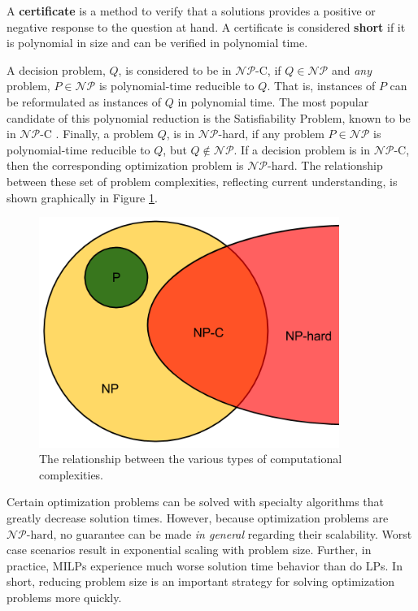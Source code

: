 \begin{define}
A \textbf{certificate} is a method to verify that a solutions provides a
positive or negative response to the question at hand. A certificate is
considered \textbf{short} if it is polynomial in size and can be verified in
polynomial time.
\end{define}

\noindent
A decision problem, $Q$, is considered to be in $\mathcal{NP}$-C, if $Q \in
\mathcal{NP}$ and \textit{any} problem, $P \in \mathcal{NP}$ is polynomial-time
reducible to $Q$. That is, instances of $P$ can be reformulated as instances of
$Q$ in polynomial time. The most popular candidate of this polynomial reduction
is the Satisfiability Problem, known to be in $\mathcal{NP}$-C
\cite{Cook:1971:CTP,levin1973universal}. Finally, a problem $Q$, is in
$\mathcal{NP}$-hard, if any problem $P \in \mathcal{NP}$ is polynomial-time
reducible to $Q$, but $Q \not\in \mathcal{NP}$. If a decision problem is in
$\mathcal{NP}$-C, then the corresponding optimization problem is
$\mathcal{NP}$-hard. The relationship between these set of problem complexities,
reflecting current understanding, is shown graphically in Figure
\ref{fig:complexity}.

\begin{figure}[H]
  \begin{center}
    \includegraphics[height=7.5cm]{./chapters/1-intro/figs/complexity.png}
  \caption{The relationship between the various types of computational complexities.}
  \label{fig:complexity}
  \end{center}
\end{figure}

Certain optimization problems can be solved with specialty algorithms that
greatly decrease solution times. However, because optimization problems are
$\mathcal{NP}\text{-hard}$, no guarantee can be made \textit{in general}
regarding their scalability. Worst case scenarios result in exponential scaling
with problem size. Further, in practice, MILPs experience much worse solution
time behavior than do LPs. In short, reducing problem size is an important
strategy for solving optimization problems more quickly.
